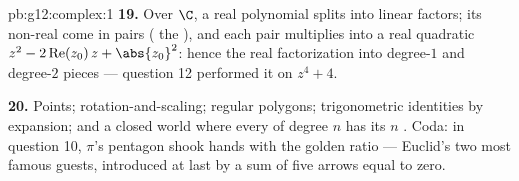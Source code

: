 \begin{solution}{pb:g12:complex:1}
\textbf{19.} Over $\C$, a real polynomial splits into linear
factors; its non-real  come in  pairs (
the ), and each pair multiplies into a real quadratic
$z^2 - 2\operatorname{Re}(z_0)\,z + \abs{z_0}^2$: hence the
real factorization into degree-$1$ and degree-$2$ pieces ---
question 12 performed it on $z^4 + 4$.

\textbf{20.} Points; rotation-and-scaling; regular polygons;
trigonometric identities by expansion; and a closed world
where every  of degree $n$ has its $n$ . Coda:
in question 10, $\pi$'s pentagon shook hands with the golden
ratio --- Euclid's two most famous guests, introduced at last
by a sum of five arrows equal to zero.
\end{solution}
